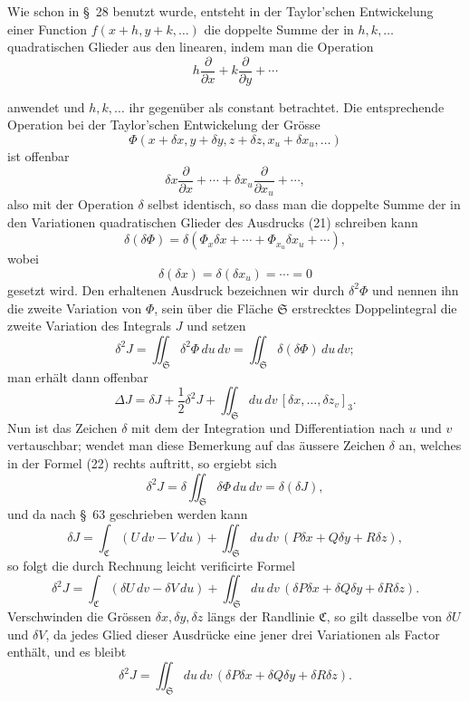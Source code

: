 \documentclass[11pt,a4paper,leqno]{article}
\begin{document}
Wie schon in \S~28 benutzt wurde, entsteht in der Taylor'schen
Entwickelung einer Function $f(x+h,y+k,\ldots)$ die doppelte Summe
der in $h,k,\ldots$ quadratischen Glieder aus den linearen, indem man
die Operation
\[
h\frac{\partial}{\partial x}+k\frac{\partial}{\partial y}+\cdots
\]

anwendet und $h,k,\ldots$ ihr gegenüber als constant betrachtet.
Die entsprechende Operation bei der Taylor'schen Entwickelung der Grösse
\begin{equation}\tag{21}
\Phi(x+\delta x,y+\delta y,z+\delta z,x_u+\delta x_u,\ldots)
\end{equation}
ist offenbar
\[
\delta x\frac{\partial}{\partial x}+\cdots
+\delta x_u\frac{\partial}{\partial x_u}+\cdots,
\]
also mit der Operation $\delta$ selbst identisch, so dass man die doppelte
Summe der in den Variationen quadratischen Glieder des Ausdrucks (21)
schreiben kann
\[
\delta(\delta\Phi)
=\delta(\Phi_x\delta x+\cdots+\Phi_{x_u}\delta x_u+\cdots),
\]
wobei
\[
\delta(\delta x)=\delta(\delta x_u)=\cdots=0
\]
gesetzt wird. Den erhaltenen Ausdruck bezeichnen wir durch $\delta^2\Phi$
und nennen ihn die zweite Variation von $\Phi$, sein über die Fläche
$\mathfrak{S}$ erstrecktes Doppelintegral die zweite Variation des
Integrals $J$ und setzen
\begin{equation}\tag{22}
\delta^2J=\iint_{\mathfrak{S}}\delta^2\Phi\,du\,dv
=\iint_{\mathfrak{S}}\delta(\delta\Phi)\,du\,dv;
\end{equation}
man erhält dann offenbar
\[
\Delta J=\delta J+\frac12\delta^2J
+\iint_{\mathfrak{S}}du\,dv\,[\delta x,\ldots,\delta z_v]_3.
\]
Nun ist das Zeichen $\delta$ mit dem der Integration und Differentiation
nach $u$ und $v$ vertauschbar; wendet man diese Bemerkung auf das äussere
Zeichen $\delta$ an, welches in der Formel (22) rechts auftritt, so ergiebt
sich
\[
\delta^2J=\delta\iint_{\mathfrak{S}}\delta\Phi\,du\,dv
=\delta(\delta J),
\]
und da nach \S~63 geschrieben werden kann
\begin{equation}\tag{23}
\delta J=\int_{\mathfrak{C}}(U\,dv-V\,du)
+\iint_{\mathfrak{S}}du\,dv\,(P\delta x+Q\delta y+R\delta z),
\end{equation}
so folgt die durch Rechnung leicht verificirte Formel
\[
\delta^2J=\int_{\mathfrak{C}}(\delta U\,dv-\delta V\,du)
+\iint_{\mathfrak{S}}du\,dv\,
(\delta P\delta x+\delta Q\delta y+\delta R\delta z).
\]
Verschwinden die Grössen $\delta x,\delta y,\delta z$ längs der Randlinie
$\mathfrak{C}$, so gilt dasselbe von $\delta U$ und $\delta V$, da jedes
Glied dieser Ausdrücke eine jener drei Variationen als Factor enthält, und
es bleibt
\[
\delta^2J=\iint_{\mathfrak{S}}du\,dv\,
(\delta P\delta x+\delta Q\delta y+\delta R\delta z).
\]
\end{document}
